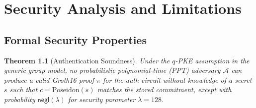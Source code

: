 \documentclass[12pt,a4paper,oneside]{report}
\newtheorem{theorem}{Theorem}[chapter]
\begin{document}
\chapter{Security Analysis and Limitations}
\label{sec:security}

\section{Formal Security Properties}

\begin{theorem}[Authentication Soundness]
Under the $q$-PKE assumption in the generic group model, no probabilistic
polynomial-time (PPT) adversary $\mathcal{A}$ can produce a valid Groth16
proof $\pi$ for the auth circuit without knowledge of a secret $s$ such
that $c = \mathrm{Poseidon}(s)$ matches the stored commitment, except with
probability $\mathsf{negl}(\lambda)$ for security parameter
$\lambda = 128$.
\end{theorem}
\end{document}
